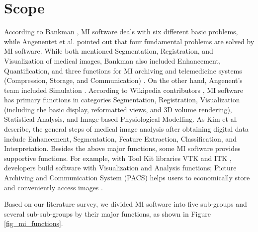 \section{Scope}
\label{sec_scope}
According to Bankman \cite{Bankman2000}, MI software deals with six different basic problems, while Angenentet et al. \cite{Angenent2006} pointed out that four fundamental problems are solved by MI software. While both mentioned Segmentation, Registration, and Visualization of medical images, Bankman also included Enhancement, Quantification, and three functions for MI archiving and telemedicine systems (Compression, Storage, and Communication) \cite{Bankman2000}. On the other hand, Angenent's team included Simulation \cite{Angenent2006}. According to Wikipedia contributors \cite{enwiki:1034877594}, MI software has primary functions in categories Segmentation, Registration, Visualization (including the basic display, reformatted views, and 3D volume rendering), Statistical Analysis, and Image-based Physiological Modelling. As Kim et al. \cite{Kim2011} describe, the general steps of medical image analysis after obtaining digital data include Enhancement, Segmentation, Feature Extraction, Classification, and Interpretation. Besides the above major functions, some MI software provides supportive functions. For example, with Tool Kit libraries VTK \cite{SchroederEtAl2006} and ITK \cite{McCormick2014}, developers build software with Visualization and Analysis functions; Picture Archiving and Communication System (PACS) helps users to economically store and conveniently access images \cite{Choplin1992}. 

Based on our literature survey, we divided MI software into five sub-groups and several sub-sub-groups by their major functions, as shown in Figure \ref{fig_mi_functions}.

